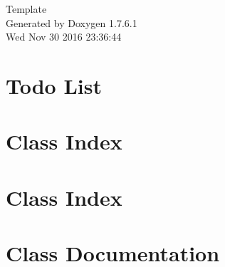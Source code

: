 \documentclass[a4paper]{book}
\begin{document}
\hypersetup{pageanchor=false,citecolor=blue}
\begin{titlepage}
\vspace*{7cm}
\begin{center}
{\Large \-Template }\\
\vspace*{1cm}
{\large \-Generated by Doxygen 1.7.6.1}\\
\vspace*{0.5cm}
{\small Wed Nov 30 2016 23:36:44}\\
\end{center}
\end{titlepage}
\clearemptydoublepage
{}
\tableofcontents
\clearemptydoublepage
{}
\hypersetup{pageanchor=true,citecolor=blue}
\chapter{\-Todo \-List}
\label{todo}
\hypertarget{todo}{}

\chapter{\-Class \-Index}

\chapter{\-Class \-Index}

\chapter{\-Class \-Documentation}




























\printindex
\end{document}
